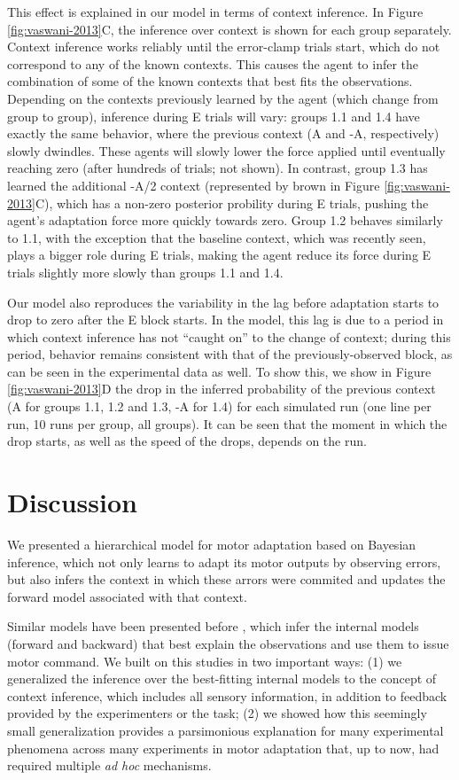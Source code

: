 \documentclass[a4paper,doc,floatsintext,natbib]{apa6}
\def \fref #1{Figure \ref{#1}}     %
\begin{document}
This effect is explained in our model in terms of context inference. In \fref{fig:vaswani-2013}C, the inference over context is shown for each group separately. Context inference works reliably until the error-clamp trials start, which do not correspond to any of the known contexts. This causes the agent to infer the combination of some of the known contexts that best fits the observations. Depending on the contexts previously learned by the agent (which change from group to group), inference during E trials will vary: groups 1.1 and 1.4 have exactly the same behavior, where the previous context (A and -A, respectively) slowly dwindles. These agents will slowly lower the force applied until eventually reaching zero (after hundreds of trials; not shown). In contrast, group 1.3 has learned the additional -A/2 context (represented by brown in \fref{fig:vaswani-2013}C), which has a non-zero posterior probility during E trials, pushing the agent's adaptation force more quickly towards zero. Group 1.2 behaves similarly to 1.1, with the exception that the baseline context, which was recently seen, plays a bigger role during E trials, making the agent reduce its force during E trials slightly more slowly than groups 1.1 and 1.4.


Our model also reproduces the variability in the lag before adaptation starts to drop to zero after the E block starts. In the model, this lag is due to a period in which context inference has not ``caught on'' to the change of context; during this period, behavior remains consistent with that of the previously-observed block, as can be seen in the experimental data as well. To show this, we show in \fref{fig:vaswani-2013}D the drop in the inferred probability of the previous context (A for groups 1.1, 1.2 and 1.3, -A for 1.4) for each simulated run (one line per run, 10 runs per group, all groups). It can be seen that the moment in which the drop starts, as well as the speed of the drops, depends on the run.

\section{Discussion}
We presented a hierarchical model for motor adaptation based on Bayesian inference, which not only learns to adapt its motor outputs by observing errors, but also infers the context in which these arrors were commited and updates the forward model associated with that context.

Similar models have been presented before \cite[e.g.][]{Wolpert_Multiple_1998a,Baddeley_System_2003}, which infer the internal models (forward and backward) that best explain the observations and use them to issue motor command. We built on this studies in two important ways: (1) we generalized the inference over the best-fitting internal models to the concept of context inference, which includes all sensory information, in addition to feedback provided by the experimenters or the task; (2) we showed how this seemingly small generalization provides a parsimonious explanation for many experimental phenomena across many experiments in motor adaptation that, up to now, had required multiple \textit{ad hoc} mechanisms.
\end{document}
